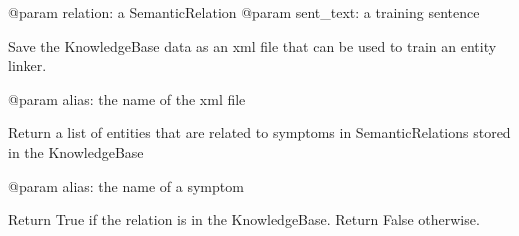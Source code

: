 \documentclass[letterpaper,10pt,english]{sphinxmanual}
\begin{document}
\begin{fulllineitems}
\begin{fulllineitems}
\sphinxAtStartPar
@param relation: a SemanticRelation
@param sent\_text: a training sentence

\end{fulllineitems}


\begin{fulllineitems}
\label{\detokenize{medextractor.knowledge:medextractor.knowledge.base.KnowledgeBase.export_for_entity_linker}}
\pysigstartsignatures
{}
\pysigstopsignatures
\sphinxAtStartPar
Save the KnowledgeBase data as an xml file that can be used to train an entity linker.

\sphinxAtStartPar
@param alias: the name of the xml file

\end{fulllineitems}


\begin{fulllineitems}
\label{\detokenize{medextractor.knowledge:medextractor.knowledge.base.KnowledgeBase.give_entities}}
\pysigstartsignatures
{}
\pysigstopsignatures
\sphinxAtStartPar
Return a list of entities that are related to symptoms in SemanticRelations stored in the KnowledgeBase

\sphinxAtStartPar
@param alias: the name of a symptom

\end{fulllineitems}


\begin{fulllineitems}
\label{\detokenize{medextractor.knowledge:medextractor.knowledge.base.KnowledgeBase.has_relation}}
\pysigstartsignatures
{}
\pysigstopsignatures
\sphinxAtStartPar
Return True if the relation is in the KnowledgeBase. Return False otherwise.


\end{fulllineitems}
\end{fulllineitems}
\end{document}
